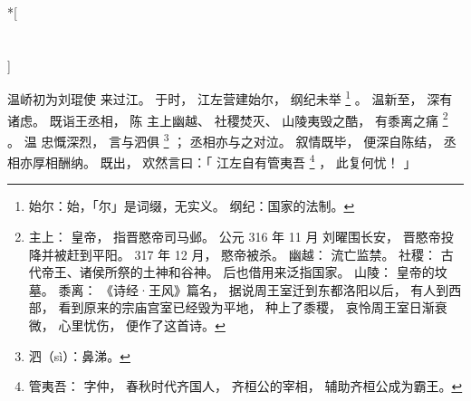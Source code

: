 
\switchcolumn[0]*[\section{}]

温峤初为刘琨使
来过江。
于时，
江左营建始尔，
纲纪未举%
\footnote{%
    始尔：始，「尔」是词缀，无实义。
    纲纪：国家的法制。
}%
。
温新至，
深有诸虑。
既诣王丞相，
陈
主上幽越、
社稷焚灭、
山陵夷毁之酷，
有黍离之痛%
\footnote{%
    主上：
        皇帝，
        指晋愍帝司马邺。
        公元 316 年 11 月
        刘曜围长安，
        晋愍帝投降并被赶到平阳。
        317 年 12 月，
        愍帝被杀。
    幽越：
        流亡监禁。
    社稷：
        古代帝王、诸侯所祭的土神和谷神。
        后也借用来泛指国家。
    山陵：
        皇帝的坟墓。
    黍离：
        《诗经·王风》篇名，
        据说周王室迁到东都洛阳以后，
        有人到西部，
        看到原来的宗庙宫室已经毁为平地，
        种上了黍稷，
        哀怜周王室日渐衰微，
        心里忧伤，
        便作了这首诗。
}%
。
温
忠慨深烈，
言与泗俱%
\footnote{%
    泗（sì）：鼻涕。
}%
；
丞相亦与之对泣。
叙情既毕，
便深自陈结，
丞相亦厚相酬纳。
既出，
欢然言曰：「
    江左自有管夷吾%
    \footnote{%
        管夷吾：
            字仲，
            春秋时代齐国人，
            齐桓公的宰相，
            辅助齐桓公成为霸王。
    }%
    ，
    此复何忧！
」

\switchcolumn




